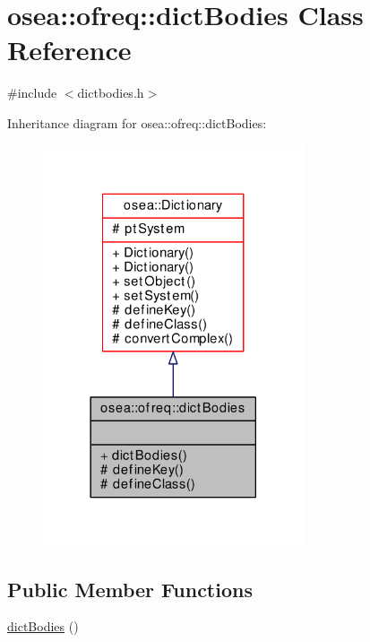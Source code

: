 \hypertarget{classosea_1_1ofreq_1_1dict_bodies}{\section{osea\-:\-:ofreq\-:\-:dict\-Bodies Class Reference}
\label{classosea_1_1ofreq_1_1dict_bodies}
}


{\ttfamily \#include $<$dictbodies.\-h$>$}



Inheritance diagram for osea\-:\-:ofreq\-:\-:dict\-Bodies\-:\nopagebreak
\begin{figure}[H]
\begin{center}
\leavevmode
\includegraphics[width=218pt]{classosea_1_1ofreq_1_1dict_bodies__inherit__graph}
\end{center}
\end{figure}
\subsection*{Public Member Functions}
\begin{DoxyCompactItemize}
\item 
\hyperlink{classosea_1_1ofreq_1_1dict_bodies_af8245ee07739bfa399051cbb5aac7f9d}{dict\-Bodies} ()
\end{DoxyCompactItemize}
